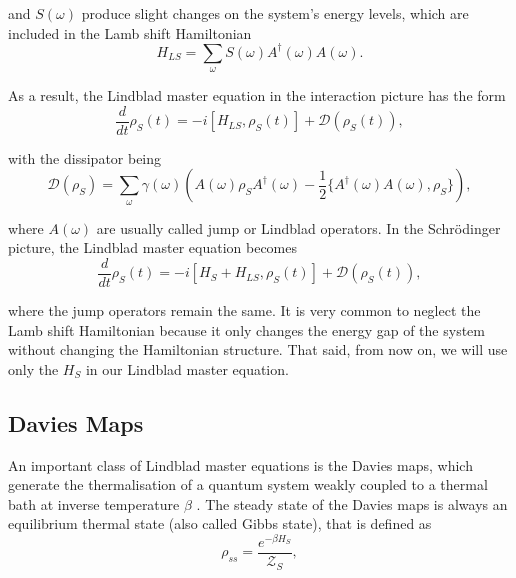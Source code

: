 \noindent and $S (\omega)$ produce slight changes on the system's energy levels, which are included in the Lamb shift Hamiltonian \cite{petruccione-book}
\begin{equation}
    {H}_{LS} = \sum_\omega S (\omega) {A}^\dagger (\omega) {A} (\omega).
    \label{eq:hamiltonian-lamb-shift}
\end{equation}

\noindent As a result, the Lindblad master equation in the interaction picture has the form
\begin{equation}
    \frac{d}{dt} {\rho}_{S}(t) = -i [{H}_{LS}, {\rho}_S (t)] + \mathcal{D}({\rho}_S(t)),
    \label{eq:lindblad-interaction-picture}
\end{equation}

\noindent with the dissipator being
\begin{equation}
    \mathcal{D}({\rho}_S) = \sum_\omega \gamma (\omega) \left({A} (\omega) {\rho}_S {A}^\dagger (\omega) - \frac{1}{2} \{ {A}^\dagger (\omega) {A} (\omega) , {\rho}_S \} \right),
    \label{eq:dissipator}
\end{equation}

\noindent where ${A} (\omega)$ are usually called jump or Lindblad operators. In the Schrödinger picture, the Lindblad master equation becomes
\begin{equation}
    \frac{d}{dt} {\rho}_{S}(t) = -i [{H}_S + {H}_{LS}, {\rho}_S (t)] + \mathcal{D}({\rho}_S(t)),
    \label{eq:lindblad}
\end{equation}

\noindent where the jump operators remain the same. It is very common to neglect the Lamb shift Hamiltonian because it only changes the energy gap of the system without changing the Hamiltonian structure. That said, from now on, we will use only the ${H}_S$ in our Lindblad master equation.



\subsection{Davies Maps}\label{sec:davies-maps}

An important class of Lindblad master equations is the Davies maps, which generate the thermalisation of a quantum system weakly coupled to a thermal bath at inverse temperature $\beta$ \cite{davies-1979}. The steady state of the Davies maps is always an equilibrium thermal state (also called Gibbs state), that is defined as
\begin{equation}
    {\rho}_{ss} = \frac{e^{-\beta {H}_S}}{\mathcal{Z}_S},
\end{equation}


